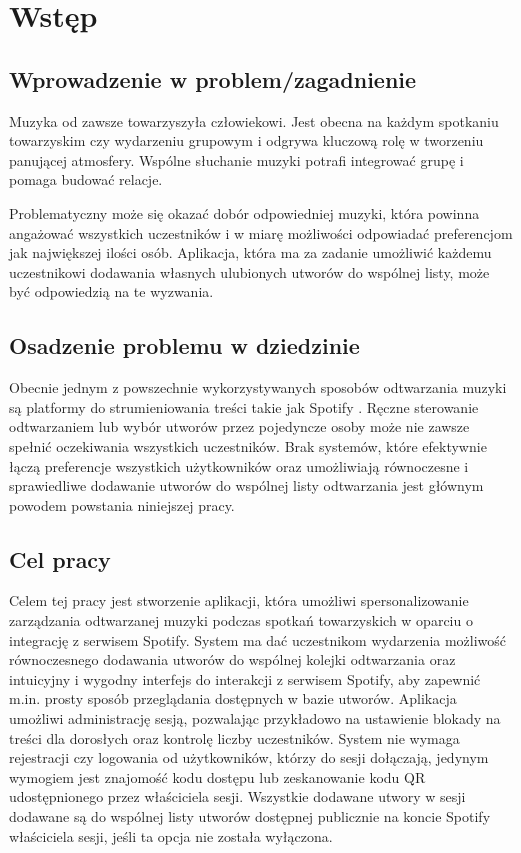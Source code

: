 \chapter{Wstęp}
\label{ch:wstep}

\section{Wprowadzenie w problem/zagadnienie}
Muzyka od zawsze towarzyszyła człowiekowi. Jest obecna na każdym spotkaniu towarzyskim czy wydarzeniu grupowym i odgrywa kluczową rolę w tworzeniu panującej atmosfery. Wspólne słuchanie muzyki potrafi integrować grupę i pomaga budować relacje. 

Problematyczny może się okazać dobór odpowiedniej muzyki, która powinna angażować wszystkich uczestników i w miarę możliwości odpowiadać preferencjom jak największej ilości osób. Aplikacja, która ma za zadanie umożliwić każdemu uczestnikowi dodawania własnych ulubionych utworów do wspólnej listy, może być odpowiedzią na te wyzwania.
 
\section{Osadzenie problemu w dziedzinie}
Obecnie jednym z powszechnie wykorzystywanych sposobów odtwarzania muzyki są platformy do strumieniowania treści takie jak Spotify \cite{bib:music_report}. Ręczne sterowanie odtwarzaniem lub wybór utworów przez pojedyncze osoby może nie zawsze spełnić oczekiwania wszystkich uczestników. Brak systemów, które efektywnie łączą preferencje wszystkich użytkowników oraz umożliwiają równoczesne i sprawiedliwe dodawanie utworów do wspólnej listy odtwarzania jest głównym powodem powstania niniejszej pracy.

\section{Cel pracy}
Celem tej pracy jest stworzenie aplikacji, która umożliwi spersonalizowanie zarządzania odtwarzanej muzyki podczas spotkań towarzyskich w oparciu o integrację z serwisem Spotify. System ma dać uczestnikom wydarzenia możliwość równoczesnego dodawania utworów do wspólnej kolejki odtwarzania oraz intuicyjny i wygodny interfejs do interakcji z serwisem Spotify, aby zapewnić m.in. prosty sposób przeglądania dostępnych w bazie utworów. Aplikacja umożliwi administrację sesją, pozwalając przykładowo na ustawienie blokady na treści dla dorosłych oraz kontrolę liczby uczestników. System nie wymaga rejestracji czy logowania od użytkowników, którzy do sesji dołączają, jedynym wymogiem jest znajomość kodu dostępu lub zeskanowanie kodu QR udostępnionego przez właściciela sesji. Wszystkie dodawane utwory w sesji dodawane są do wspólnej listy utworów dostępnej publicznie na koncie Spotify właściciela sesji, jeśli ta opcja nie została wyłączona.

